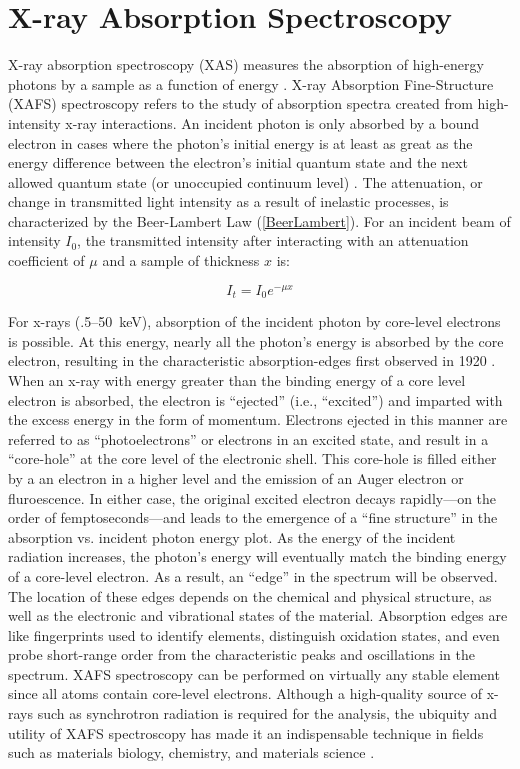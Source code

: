 \section{X-ray Absorption Spectroscopy}
X-ray absorption spectroscopy (XAS) measures the absorption of high-energy photons by a sample as a function of energy \cite{gardenghi2012synchrotron}. X-ray Absorption Fine-Structure (XAFS) spectroscopy refers to the study of absorption spectra created from high-intensity x-ray interactions. An incident photon is only absorbed by a bound electron in cases where the photon's initial energy is at least as great as the energy difference between the electron’s initial quantum state and the next allowed quantum state (or unoccupied continuum level) \cite{einstein1905photoelectriceffect}. The attenuation, or change in transmitted light intensity as a result of inelastic processes, is characterized by the Beer-Lambert Law (\ref{BeerLambert}). For an incident beam of intensity $I_0$, the transmitted intensity after interacting with an attenuation
coefficient of $ \mu $ and a sample of thickness $ x $ is: 

\begin{equation}
    \label{BeerLambert}
    I_t = I_0 e^{-\mu x}
\end{equation}

For x-rays (.5--50~keV), absorption of the incident photon by core-level electrons is possible. At this energy, nearly all the photon's energy is absorbed by the core electron, resulting in the characteristic absorption-edges first observed in 1920 \cite{fricke1920, hertz1920ueber}. When an x-ray with energy greater than the binding energy of a core level electron is absorbed, the electron is “ejected” (i.e., “excited”) and imparted with the excess energy in the form of momentum. Electrons ejected in this manner are referred to as ``photoelectrons'' or electrons in an excited state, and result in a ``core-hole'' at the core level of the electronic shell. This core-hole is filled either by a an electron in a higher level and the emission of an Auger electron or fluroescence. In either case, the original excited electron decays rapidly---on the order of femptoseconds---and leads to the emergence of a ``fine structure'' in the absorption vs. incident photon energy plot. As the energy of the incident radiation increases, the photon's energy will eventually match the binding energy of a core-level electron. As a result, an ``edge'' in the spectrum will be observed. The location of these edges depends on the chemical and physical structure, as well as the electronic and vibrational states of the material. Absorption edges are like fingerprints used to identify elements, distinguish oxidation states, and even probe short-range order from the characteristic peaks and oscillations in the spectrum. XAFS spectroscopy can be performed on virtually any stable element since all atoms contain core-level electrons. Although a high-quality source of x-rays such as synchrotron radiation is required for the analysis, the ubiquity and utility of XAFS spectroscopy has made it an indispensable technique in fields such as materials biology, chemistry, and materials science \cite{rehrXAFS2000review} \cite{newville2014fundamentals}.

